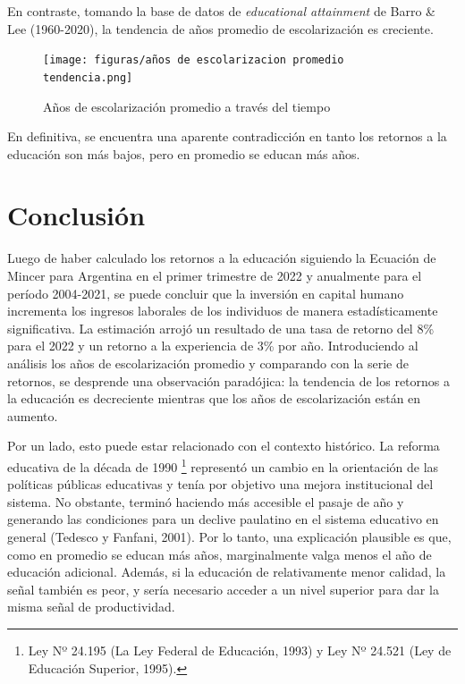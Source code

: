 \documentclass[a4paper]{article}
\theoremstyle{plain}
\theoremstyle{definition}
\begin{document}
En contraste, tomando la base de datos de \textit{educational attainment} de Barro \& Lee (1960-2020), la tendencia de años promedio de escolarización es creciente. 

\begin{figure}[h]
    \centering
    \texttt{[image: figuras/años de escolarizacion promedio tendencia.png]}
    \caption{Años de escolarización promedio a través del tiempo}
    \label{fig:my_label}
\end{figure}

En definitiva, se encuentra una aparente contradicción en tanto los retornos a la educación son más bajos, pero en promedio se educan más años. 



\newpage
\section{Conclusión}

Luego de haber calculado los retornos a la educación siguiendo la Ecuación de Mincer para Argentina en el primer trimestre de 2022 y anualmente para el período 2004-2021, se puede concluir que la inversión en capital humano incrementa los ingresos laborales de los individuos de manera estadísticamente significativa. La estimación arrojó un resultado de una tasa de retorno del 8\% para el 2022 y un retorno a la experiencia de 3\% por año. Introduciendo al análisis los años de escolarización promedio y comparando con la serie de retornos, se desprende una observación paradójica: la tendencia de los retornos a la educación es decreciente mientras que los años de escolarización están en aumento.  

Por un lado, esto puede estar relacionado con el contexto histórico. La reforma educativa de la década de 1990 \footnote{Ley Nº 24.195 (La Ley Federal de Educación, 1993) y Ley Nº 24.521 (Ley de Educación Superior, 1995).} representó un cambio en la orientación de las políticas públicas educativas y tenía por objetivo una mejora institucional del sistema. No obstante, terminó haciendo más accesible el pasaje de año y generando las condiciones para un declive paulatino en el sistema educativo en general (Tedesco y Fanfani, 2001). Por lo tanto, una explicación plausible es que, como en promedio se educan más años, marginalmente valga menos el año de educación adicional. Además, si la educación de relativamente menor calidad, la señal también es peor, y sería necesario acceder a un nivel superior para dar la misma señal de productividad. 
\end{document}
